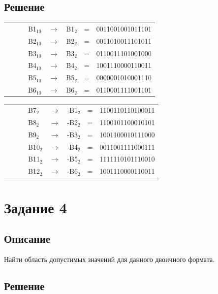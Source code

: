 \documentclass[11pt]{article}
\begin{document}
\subsection{Решение}
\label{sec:org562d63a}
\setlength{\tabcolsep}{3pt}
\label{tab:orgbcfcfed}
\begin{tabular}{llllcrcl}
 &  &  & B1\(_{\text{10}}\) & \(\to\) & B1\(_{\text{2}}\) & = & 0011001001011101\\
 &  &  & B2\(_{\text{10}}\) & \(\to\) & B2\(_{\text{2}}\) & = & 0011010011101011\\
 &  &  & B3\(_{\text{10}}\) & \(\to\) & B3\(_{\text{2}}\) & = & 0110011101001000\\
 &  &  & B4\(_{\text{10}}\) & \(\to\) & B4\(_{\text{2}}\) & = & 1001110000110011\\
 &  &  & B5\(_{\text{10}}\) & \(\to\) & B5\(_{\text{2}}\) & = & 0000001010001110\\
 &  &  & B6\(_{\text{10}}\) & \(\to\) & B6\(_{\text{2}}\) & = & 0110001111001101\\
\end{tabular}
\setlength{\tabcolsep}{3pt}
\label{tab:orgb6b5aa2}
\begin{tabular}{llllcrcl}
 &  &  & B7\(_{\text{2}}\) & \(\to\) & -B1\(_{\text{2}}\) & = & 1100110110100011\\
 &  &  & B8\(_{\text{2}}\) & \(\to\) & -B2\(_{\text{2}}\) & = & 1100101100010101\\
 &  &  & B9\(_{\text{2}}\) & \(\to\) & -B3\(_{\text{2}}\) & = & 1001100010111000\\
 &  &  & B10\(_{\text{2}}\) & \(\to\) & -B4\(_{\text{2}}\) & = & 0011001111000111\\
 &  &  & B11\(_{\text{2}}\) & \(\to\) & -B5\(_{\text{2}}\) & = & 1111110101110010\\
 &  &  & B12\(_{\text{2}}\) & \(\to\) & -B6\(_{\text{2}}\) & = & 1001110000110011\\
\end{tabular}

\section{Задание 4}
\label{sec:org13146ce}
\subsection{Описание}
\label{sec:orgabe5e8f}
Найти область допустимых значений для данного двоичного формата.

\subsection{Решение}
\label{sec:orgc4f133d}
\end{document}
